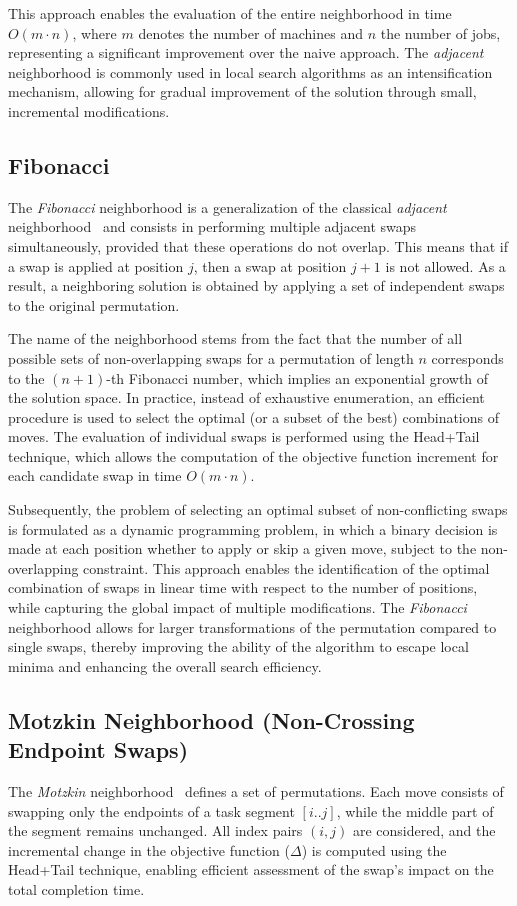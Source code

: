 \documentclass[10pt,twoside,twocolumn,a4paper]{article}
\begin{document}
This approach enables the evaluation of the entire neighborhood in time $O(m \cdot n)$, where $m$ denotes the number of machines and $n$ the number of jobs, representing a significant improvement over the naive approach. The \emph{adjacent} neighborhood is commonly used in local search algorithms as an intensification mechanism, allowing for gradual improvement of the solution through small, incremental modifications.


\subsection{Fibonacci}
The \emph{Fibonacci} neighborhood is a generalization of the classical \emph{adjacent} neighborhood~\cite{WojewodzkiBozejko2026} and consists in performing multiple adjacent swaps simultaneously, provided that these operations do not overlap. This means that if a swap is applied at position $j$, then a swap at position $j+1$ is not allowed. As a result, a neighboring solution is obtained by applying a set of independent swaps to the original permutation.

The name of the neighborhood stems from the fact that the number of all possible sets of non-overlapping swaps for a permutation of length $n$ corresponds to the $(n+1)$-th Fibonacci number, which implies an exponential growth of the solution space. In practice, instead of exhaustive enumeration, an efficient procedure is used to select the optimal (or a subset of the best) combinations of moves. The evaluation of individual swaps is performed using the Head+Tail technique, which allows the computation of the objective function increment for each candidate swap in time $O(m \cdot n)$.

Subsequently, the problem of selecting an optimal subset of non-conflicting swaps is formulated as a dynamic programming problem, in which a binary decision is made at each position whether to apply or skip a given move, subject to the non-overlapping constraint. This approach enables the identification of the optimal combination of swaps in linear time with respect to the number of positions, while capturing the global impact of multiple modifications. The \emph{Fibonacci} neighborhood allows for larger transformations of the permutation compared to single swaps, thereby improving the ability of the algorithm to escape local minima and enhancing the overall search efficiency.


\subsection{Motzkin Neighborhood (Non-Crossing Endpoint Swaps)}
The \emph{Motzkin} neighborhood~\cite{Motzkin_PWR, Motzkin_PWR_EXIT, motzkin1948} defines a set of permutations. Each move consists of swapping only the endpoints of a task segment $[i..j]$, while the middle part of the segment remains unchanged. All index pairs $(i,j)$ are considered, and the incremental change in the objective function ($\Delta$) is computed using the Head+Tail technique, enabling efficient assessment of the swap's impact on the total completion time.
\end{document}
